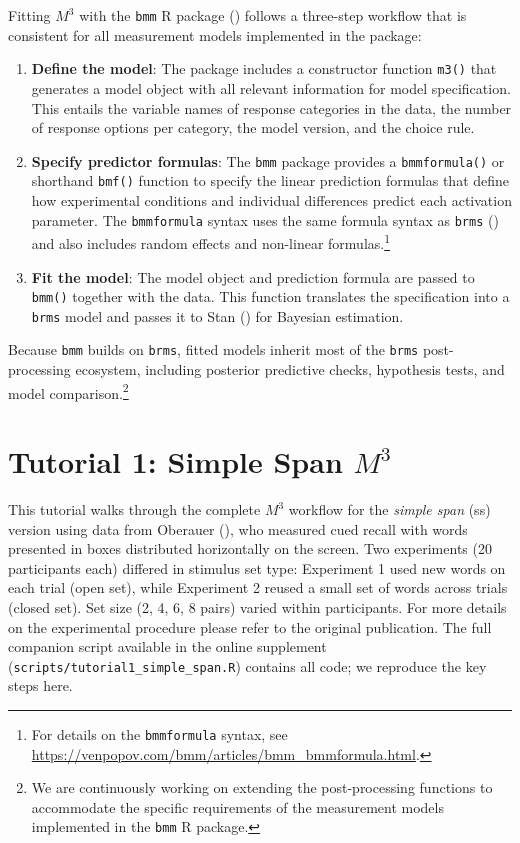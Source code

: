 \documentclass[
  man,
  floatsintext,
  longtable,
  nolmodern,
  notxfonts,
  notimes,
  colorlinks=true,linkcolor=blue,citecolor=blue,urlcolor=blue]{apa7}
\providecommand{\tightlist}{%
  \setlength{\itemsep}{0pt}\setlength{\parskip}{0pt}}
\begin{document}
Fitting \(M^3\) with the \texttt{bmm} R package
() follows a three-step
workflow that is consistent for all measurement models implemented in
the package:

\begin{enumerate}
\def\labelenumi{\arabic{enumi}.}
\tightlist
\item
  \textbf{Define the model}: The package includes a constructor function
  \texttt{m3()} that generates a model object with all relevant
  information for model specification. This entails the variable names
  of response categories in the data, the number of response options per
  category, the model version, and the choice rule.
\item
  \textbf{Specify predictor formulas}: The \texttt{bmm} package provides
  a \texttt{bmmformula()} or shorthand \texttt{bmf()} function to
  specify the linear prediction formulas that define how experimental
  conditions and individual differences predict each activation
  parameter. The \texttt{bmmformula} syntax uses the same formula syntax
  as \texttt{brms} () and
  also includes random effects and non-linear formulas.\footnote{For
    details on the \texttt{bmmformula} syntax, see
    \url{https://venpopov.com/bmm/articles/bmm_bmmformula.html}.}
\item
  \textbf{Fit the model}: The model object and prediction formula are
  passed to \texttt{bmm()} together with the data. This function
  translates the specification into a \texttt{brms} model and passes it
  to Stan () for
  Bayesian estimation.
\end{enumerate}

Because \texttt{bmm} builds on \texttt{brms}, fitted models inherit most
of the \texttt{brms} post-processing ecosystem, including posterior
predictive checks, hypothesis tests, and model comparison.\footnote{We
  are continuously working on extending the post-processing functions to
  accommodate the specific requirements of the measurement models
  implemented in the \texttt{bmm} R package.}

\section{\texorpdfstring{Tutorial 1: Simple Span
\(M^3\)}{Tutorial 1: Simple Span M\^{}3}}\label{tutorial-1-simple-span-m3}

This tutorial walks through the complete \(M^3\) workflow for the
\emph{simple span} (ss) version using data from Oberauer
(), who measured cued recall
with words presented in boxes distributed horizontally on the screen.
Two experiments (20 participants each) differed in stimulus set type:
Experiment 1 used new words on each trial (open set), while Experiment 2
reused a small set of words across trials (closed set). Set size (2, 4,
6, 8 pairs) varied within participants. For more details on the
experimental procedure please refer to the original publication. The
full companion script available in the online supplement
(\texttt{scripts/tutorial1\_simple\_span.R}) contains all code; we
reproduce the key steps here.
\end{document}
